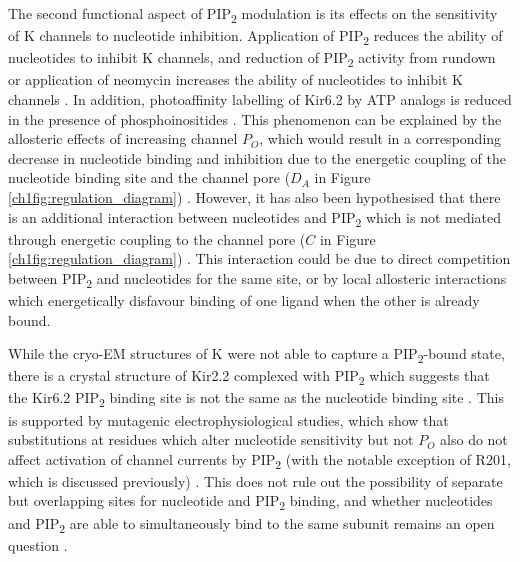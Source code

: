 The second functional aspect of PIP\textsubscript{2} modulation is its effects on the sensitivity of K\ATP{} channels to nucleotide inhibition.
Application of PIP\textsubscript{2} reduces the ability of nucleotides to inhibit K\ATP{} channels, and reduction of PIP\textsubscript{2} activity from rundown or application of neomycin increases the ability of nucleotides to inhibit K\ATP{} channels \cite{baukrowitz_pip2_1998, shyng_membrane_1998, fan_phosphoinositides_1999, enkvetchakul_kinetic_2000}.
In addition, photoaffinity labelling of Kir6.2 by ATP analogs is reduced in the presence of phosphoinositides \cite{wang_compromised_2002}.
This phenomenon can be explained by the allosteric effects of increasing channel $P_O$, which would result in a corresponding decrease in nucleotide binding and inhibition due to the energetic coupling of the nucleotide binding site and the channel pore ($D_A$ in Figure \ref{ch1fig:regulation_diagram}) \cite{proks_modeling_2009}.
However, it has also been hypothesised that there is an additional interaction between nucleotides and PIP\textsubscript{2} which is not mediated through energetic coupling to the channel pore ($C$ in Figure \ref{ch1fig:regulation_diagram}) \cite{fan_phosphoinositides_1999, macgregor_nucleotides_2002, proks_modeling_2009, haider_identification_2007}.
This interaction could be due to direct competition between PIP\textsubscript{2} and nucleotides for the same site, or by local allosteric interactions which energetically disfavour binding of one ligand when the other is already bound.

While the cryo-EM structures of K\ATP{} were not able to capture a PIP\textsubscript{2}-bound state, there is a crystal structure of Kir2.2 complexed with PIP\textsubscript{2} which suggests that the Kir6.2 PIP\textsubscript{2} binding site is not the same as the nucleotide binding site \cite{hansen_structural_2011}.
This is supported by mutagenic electrophysiological studies, which show that substitutions at residues which alter nucleotide sensitivity but not $P_O$ also do not affect activation of channel currents by PIP\textsubscript{2} (with the notable exception of R201, which is discussed previously) \cite{fan_anionic_1997, shyng_structural_2000, schulze_phosphatidylinositol_2003, haider_identification_2007}.
This does not rule out the possibility of separate but overlapping sites for nucleotide and PIP\textsubscript{2} binding, and whether nucleotides and PIP\textsubscript{2} are able to simultaneously bind to the same subunit remains an open question \cite{enkvetchakul_gating_2003-2, proks_modeling_2009}.
